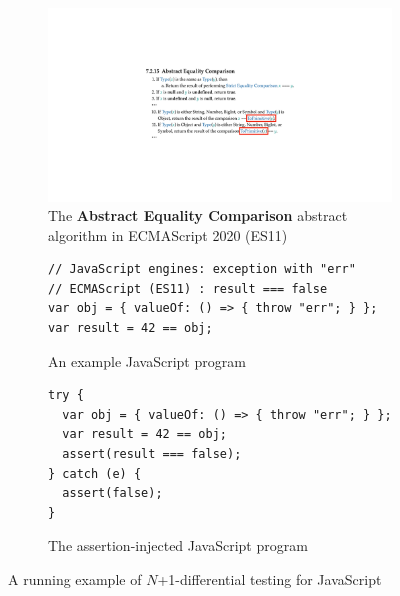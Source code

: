 \begin{figure}[t]
  \centering
  \begin{subfigure}[t]{0.48\textwidth}
    \includegraphics[width=\textwidth]{img/example-algo.pdf}
    \caption{The \textbf{Abstract Equality Comparison} abstract algorithm in
    ECMAScript 2020 (ES11)}
    \label{fig:example-algo}
  \end{subfigure}
  \begin{subfigure}[t]{0.43\textwidth}
    \begin{lstlisting}[style=myJSstyle]
// JavaScript engines: exception with "err"
// ECMAScript (ES11) : result === false
var obj = { valueOf: () => { throw "err"; } };
var result = 42 == obj;
    \end{lstlisting}
    \caption{An example JavaScript program}
    \label{fig:example-js}
  \end{subfigure}
  \begin{subfigure}[t]{0.45\textwidth}
    \begin{lstlisting}[style=myJSstyle]
try {
  var obj = { valueOf: () => { throw "err"; } };
  var result = 42 == obj;
  assert(result === false);
} catch (e) {
  assert(false);
}
    \end{lstlisting}
    \caption{The assertion-injected JavaScript program}
    \label{fig:example-injected}
  \end{subfigure}
  \caption{A running example of $N$+1-differential testing for JavaScript}
  \label{fig:example}
  \vspace*{-1em}
\end{figure}

